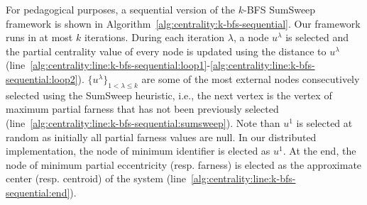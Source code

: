 For pedagogical purposes, a sequential version of the $k$-BFS SumSweep framework is shown in Algorithm~\ref{alg:centrality:k-bfs-sequential}. Our framework runs in at most $k$ iterations. During each iteration $\lambda$, a node $u^\lambda$ is selected and the partial centrality value of every node is updated using the distance to $u^\lambda$ (line~\ref{alg:centrality:line:k-bfs-sequential:loop1}-\ref{alg:centrality:line:k-bfs-sequential:loop2}). $\{u^\lambda\}_{1<\lambda\leq k}$ are some of the most external nodes consecutively selected using the SumSweep heuristic, i.e., the next vertex is the vertex of maximum partial farness that has not been previously selected (line~\ref{alg:centrality:line:k-bfs-sequential:sumsweep}). Note than $u^1$ is selected at random as initially all partial farness values are null. In our distributed implementation, the node of minimum identifier is elected as $u^1$. At the end, the node of minimum partial eccentricity (resp. farness) is elected as the approximate center (resp. centroid) of the system (line~\ref{alg:centrality:line:k-bfs-sequential:end}).


